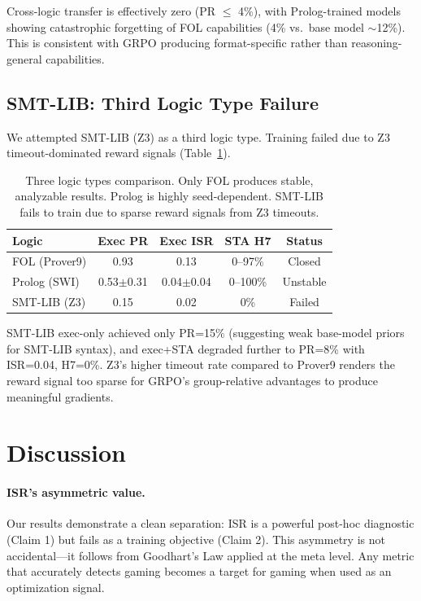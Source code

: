 \documentclass[11pt,a4paper]{article}
\newcommand{\ISR}{\textsc{ISR}}
\newcommand{\GRPO}{\textsc{GRPO}}
\begin{document}
Cross-logic transfer is effectively zero (PR $\leq$ 4\%), with Prolog-trained models showing catastrophic forgetting of FOL capabilities (4\% vs.\ base model $\sim$12\%). This is consistent with \GRPO{} producing format-specific rather than reasoning-general capabilities.

\subsection{SMT-LIB: Third Logic Type Failure}

We attempted SMT-LIB (Z3) as a third logic type. Training failed due to Z3 timeout-dominated reward signals (Table~\ref{tab:three_logics}).

\begin{table}[h]
\centering
\small
\begin{tabular}{lcccc}
\toprule
\textbf{Logic} & \textbf{Exec PR} & \textbf{Exec \ISR{}} & \textbf{STA H7} & \textbf{Status} \\
\midrule
FOL (Prover9) & 0.93 & 0.13 & 0--97\% & Closed \\
Prolog (SWI) & 0.53$\pm$0.31 & 0.04$\pm$0.04 & 0--100\% & Unstable \\
SMT-LIB (Z3) & 0.15 & 0.02 & 0\% & Failed \\
\bottomrule
\end{tabular}
\caption{Three logic types comparison. Only FOL produces stable, analyzable results. Prolog is highly seed-dependent. SMT-LIB fails to train due to sparse reward signals from Z3 timeouts.}
\label{tab:three_logics}
\end{table}

SMT-LIB exec-only achieved only PR=15\% (suggesting weak base-model priors for SMT-LIB syntax), and exec+STA degraded further to PR=8\% with ISR=0.04, H7=0\%. Z3's higher timeout rate compared to Prover9 renders the reward signal too sparse for \GRPO{}'s group-relative advantages to produce meaningful gradients.

\section{Discussion}

\paragraph{ISR's asymmetric value.} Our results demonstrate a clean separation: \ISR{} is a powerful post-hoc diagnostic (Claim 1) but fails as a training objective (Claim 2). This asymmetry is not accidental---it follows from Goodhart's Law applied at the meta level. Any metric that accurately detects gaming becomes a target for gaming when used as an optimization signal.
\end{document}
